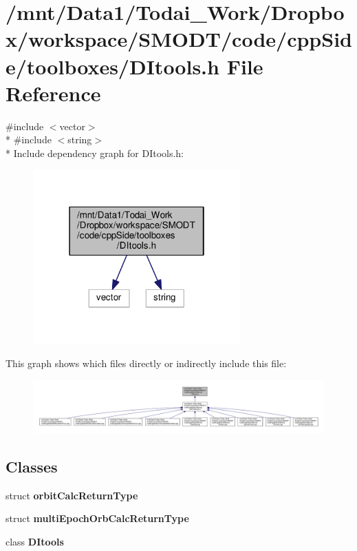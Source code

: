 \section{/mnt/\-Data1/\-Todai\-\_\-\-Work/\-Dropbox/workspace/\-S\-M\-O\-D\-T/code/cpp\-Side/toolboxes/\-D\-Itools.h File Reference}
\label{_d_itools_8h}
{\ttfamily \#include $<$vector$>$}\\*
{\ttfamily \#include $<$string$>$}\\*
Include dependency graph for D\-Itools.\-h\-:\nopagebreak
\begin{figure}[H]
\begin{center}
\leavevmode
\includegraphics[width=226pt]{_d_itools_8h__incl}
\end{center}
\end{figure}
This graph shows which files directly or indirectly include this file\-:\nopagebreak
\begin{figure}[H]
\begin{center}
\leavevmode
\includegraphics[width=350pt]{_d_itools_8h__dep__incl}
\end{center}
\end{figure}
\subsection*{Classes}
\begin{DoxyCompactItemize}
\item 
struct {\bf orbit\-Calc\-Return\-Type}
\item 
struct {\bf multi\-Epoch\-Orb\-Calc\-Return\-Type}
\item 
class {\bf D\-Itools}
\end{DoxyCompactItemize}
